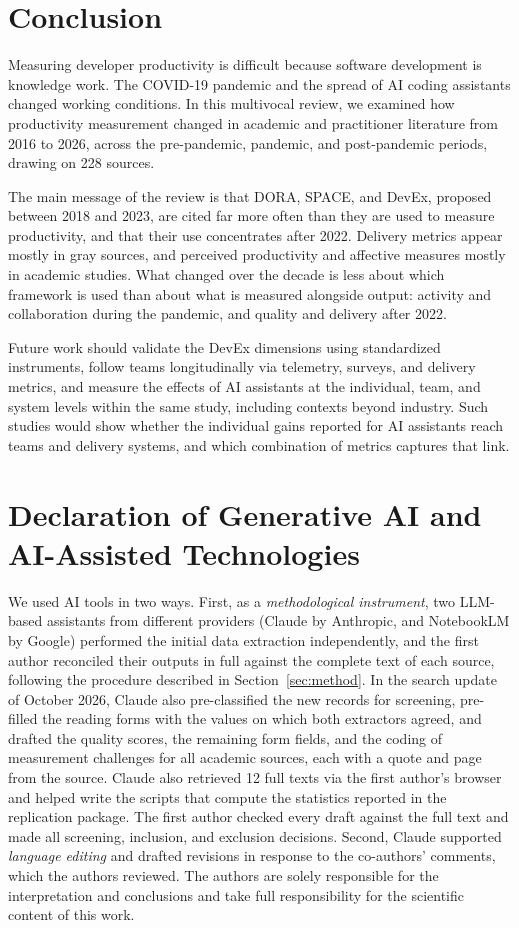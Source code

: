 \documentclass[preprint,number]{elsarticle}
\newcounter{study}
\begin{document}
\section{Conclusion}
\label{sec:conclusion}

Measuring developer productivity is difficult because software development is knowledge work. The COVID-19 pandemic and the spread of AI coding assistants changed working conditions. In this multivocal review, we examined how productivity measurement changed in academic and practitioner literature from 2016 to 2026, across the pre-pandemic, pandemic, and post-pandemic periods, drawing on 228 sources.

The main message of the review is that DORA, SPACE, and DevEx, proposed between 2018 and 2023, are cited far more often than they are used to measure productivity, and that their use concentrates after 2022. Delivery metrics appear mostly in gray sources, and perceived productivity and affective measures mostly in academic studies. What changed over the decade is less about which framework is used than about what is measured alongside output: activity and collaboration during the pandemic, and quality and delivery after 2022.

Future work should validate the DevEx dimensions using standardized instruments, follow teams longitudinally via telemetry, surveys, and delivery metrics, and measure the effects of AI assistants at the individual, team, and system levels within the same study, including contexts beyond industry. Such studies would show whether the individual gains reported for AI assistants reach teams and delivery systems, and which combination of metrics captures that link.

\section*{Declaration of Generative AI and AI-Assisted Technologies}

We used AI tools in two ways. First, as a \emph{methodological instrument}, two LLM-based assistants from different providers (Claude by Anthropic, and NotebookLM by Google) performed the initial data extraction independently, and the first author reconciled their outputs in full against the complete text of each source, following the procedure described in Section~\ref{sec:method}. In the search update of October 2026, Claude also pre-classified the new records for screening, pre-filled the reading forms with the values on which both extractors agreed, and drafted the quality scores, the remaining form fields, and the coding of measurement challenges for all academic sources, each with a quote and page from the source. Claude also retrieved 12 full texts via the first author's browser and helped write the scripts that compute the statistics reported in the replication package. The first author checked every draft against the full text and made all screening, inclusion, and exclusion decisions. Second, Claude supported \emph{language editing} and drafted revisions in response to the co-authors' comments, which the authors reviewed. The authors are solely responsible for the interpretation and conclusions and take full responsibility for the scientific content of this work.
\end{document}
